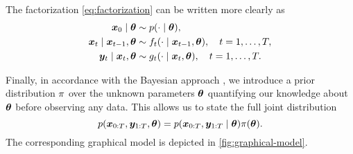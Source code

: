 The factorization \eqref{eq:factorization} can be written more clearly as
\begin{align*}
\bm{x}_0 \mid \bm{\theta} & \sim p(\cdot \mid \bm{\theta}), \\
\bm{x}_t \mid \bm{x}_{t-1}, \bm{\theta} & \sim f_t(\cdot \mid \bm{x}_{t-1}, \bm{\theta}), \quad t = 1, \ldots, T, \\
\bm{y}_t \mid \bm{x}_t, \bm{\theta} & \sim g_t(\cdot \mid \bm{x}_t, \bm{\theta}), \quad t = 1, \ldots, T.
\end{align*}

Finally, in accordance with the Bayesian approach \citep{bayes}, we introduce a prior distribution $\pi$ over the unknown parameters $\bm{\theta}$ quantifying our knowledge about $\bm{\theta}$ before observing any data. This allows us to state the full joint distribution
\begin{equation}\label{eq:full-joint}
p(\bm{x}_{0:T}, \bm{y}_{1:T}, \bm{\theta}) = p(\bm{x}_{0:T}, \bm{y}_{1:T} \mid \bm{\theta}) \pi(\bm{\theta}).
\end{equation}
The corresponding graphical model is depicted in \autoref{fig:graphical-model}.
